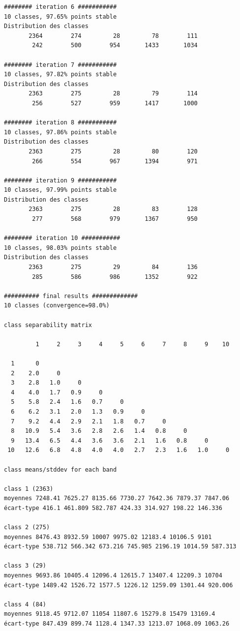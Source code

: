 \documentclass[earth,article,submit,pdftex,moreauthors]{Definitions/mdpi}
\begin{document}
{\begin{scriptsize}
\begin{verbatim}
######## iteration 6 ###########
10 classes, 97.65% points stable
Distribution des classes
       2364        274         28         78        111
        242        500        954       1433       1034

######## iteration 7 ###########
10 classes, 97.82% points stable
Distribution des classes
       2363        275         28         79        114
        256        527        959       1417       1000

######## iteration 8 ###########
10 classes, 97.86% points stable
Distribution des classes
       2363        275         28         80        120
        266        554        967       1394        971

######## iteration 9 ###########
10 classes, 97.99% points stable
Distribution des classes
       2363        275         28         83        128
        277        568        979       1367        950

######## iteration 10 ###########
10 classes, 98.03% points stable
Distribution des classes
       2363        275         29         84        136
        285        586        986       1352        922

########## final results #############
10 classes (convergence=98.0%)

class separability matrix

         1     2     3     4     5     6     7     8     9    10

  1      0
  2    2.0     0
  3    2.8   1.0     0
  4    4.0   1.7   0.9     0
  5    5.8   2.4   1.6   0.7     0
  6    6.2   3.1   2.0   1.3   0.9     0
  7    9.2   4.4   2.9   2.1   1.8   0.7     0
  8   10.9   5.4   3.6   2.8   2.6   1.4   0.8     0
  9   13.4   6.5   4.4   3.6   3.6   2.1   1.6   0.8     0
 10   12.6   6.8   4.8   4.0   4.0   2.7   2.3   1.6   1.0     0

class means/stddev for each band

class 1 (2363)
moyennes 7248.41 7625.27 8135.66 7730.27 7642.36 7879.37 7847.06
écart-type 416.1 461.809 582.787 424.33 314.927 198.22 146.336

class 2 (275)
moyennes 8476.43 8932.59 10007 9975.02 12183.4 10106.5 9101
écart-type 538.712 566.342 673.216 745.985 2196.19 1014.59 587.313

class 3 (29)
moyennes 9693.86 10405.4 12096.4 12615.7 13407.4 12209.3 10704
écart-type 1489.42 1526.72 1577.5 1226.12 1259.09 1301.44 920.006

class 4 (84)
moyennes 9118.45 9712.07 11054 11807.6 15279.8 15479 13169.4
écart-type 847.439 899.74 1128.4 1347.33 1213.07 1068.09 1063.26


\end{verbatim}
\end{scriptsize}}
\end{document}
